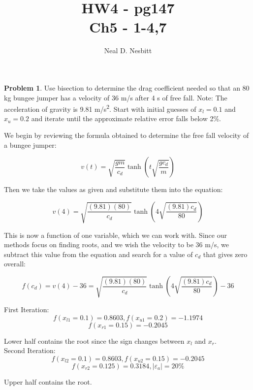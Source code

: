 \documentclass{article}
\title{HW4 - pg147\\
Ch5 - 1-4,7}
\author{Neal D. Nesbitt}
\begin{document}
\maketitle

\theoremstyle{definition}
\newtheorem{problem}{Problem}


\begin{problem}

	Use bisection to determine the drag coefficient needed so that an 80 kg bungee jumper has a velocity of 36 m/s after 4 s of free fall. Note: The acceleration of gravity is 9.81 m/s\textsuperscript{2}. Start with initial guesses of $x_{l}=0.1$ and $x_{u}=0.2$ and iterate until the approximate relative error falls below 2\%. 
	
\end{problem}

We begin by reviewing the formula obtained to determine the free fall velocity of a bungee jumper:

\[ v(t) = \sqrt{\frac{gm}{c_{d}}} \tanh\left( t \sqrt{\frac{gc_{d}}{m}} \right) \]

Then we take the values as given and substitute them into the equation:

\[ v(4) = \sqrt{\frac{(9.81)(80)}{c_{d}}} \tanh\left( 4 \sqrt{\frac{(9.81)c_{d}}{80}} \right) \]

This is now a function of one variable, which we can work with. Since our methods focus on finding roots, and we wish the velocity to be 36 m/s, we subtract this value from the equation and search for a value of $c_{d}$ that gives zero overall:

\[ f(c_{d}) = v(4) - 36 = \sqrt{\frac{(9.81)(80)}{c_{d}}} \tanh\left( 4 \sqrt{\frac{(9.81)c_{d}}{80}} \right) - 36 \]

First Iteration:
\[ f(x_{l1}=0.1) = 0.8603, f(x_{u1}=0.2) = -1.1974 \]
\[ f(x_{r1}=0.15) = -0.2045 \]

Lower half contains the root since the sign changes between $x_{l}$ and $x_{r}$.\\

Second Iteration:
\[ f(x_{l2}=0.1) = 0.8603, f(x_{u2}=0.15) = -0.2045 \]
\[ f(x_{r2}=0.125) = 0.3184, \left| \varepsilon_{a} \right| = 20\% \]

Upper half contains the root.\\
\end{document}

